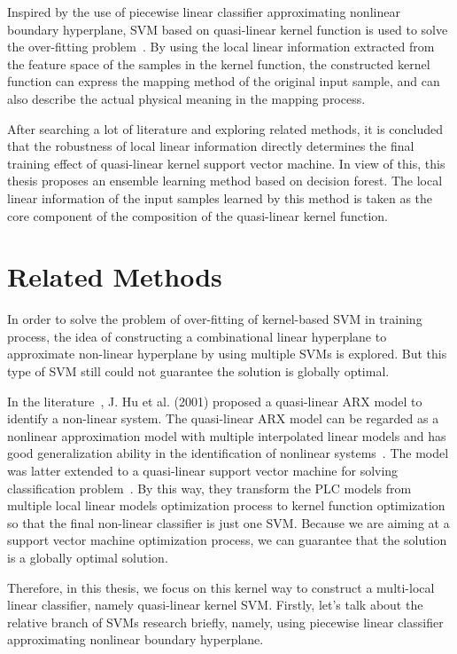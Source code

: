 \documentclass[master]{IPSstyle}
\begin{document}
Inspired by the use of piecewise linear classifier approximating nonlinear boundary hyperplane, SVM based on quasi-linear kernel function is used to solve the over-fitting problem~\cite{chen2012composite, bo2014quasi}. By using the local linear information extracted from the feature space of the samples in the kernel function, the constructed kernel function can express the mapping method of the original input sample, and can also describe the actual physical meaning in the mapping process. 

After searching a lot of literature and exploring related methods, it is concluded that the robustness of local linear information directly determines the final training effect of quasi-linear kernel support vector machine. In view of this, this thesis proposes an ensemble learning method based on decision forest. The local linear information of the input samples learned by this method is taken as the core component of the composition of the quasi-linear kernel function. 

\section{Related Methods}
In order to solve the problem of over-fitting of kernel-based SVM in training process, the idea of constructing a combinational linear hyperplane to approximate non-linear hyperplane by using multiple SVMs is explored. But this type of SVM still could not guarantee the solution is globally optimal.

In the literature~\cite{hu2001quasi}, J. Hu et al. (2001) proposed a quasi-linear ARX model to identify a non-linear system. The quasi-linear ARX model can be regarded as a nonlinear approximation model with multiple interpolated linear models and has good generalization ability in the identification of nonlinear systems~\cite{chen2010local}. The model was latter extended to a quasi-linear support vector machine for solving classification problem~\cite{chen2010local, hu2001quasi}. By this way, they transform the PLC models from multiple local linear models optimization process to kernel function optimization so that the final non-linear classifier is just one SVM. Because we are aiming at a support vector machine optimization process, we can guarantee that the solution is a globally optimal solution. 

Therefore, in this thesis, we focus on this kernel way to construct a multi-local linear classifier, namely quasi-linear kernel SVM. Firstly, let's talk about the relative branch of SVMs research briefly, namely, using piecewise linear classifier approximating nonlinear boundary hyperplane.
\end{document}
